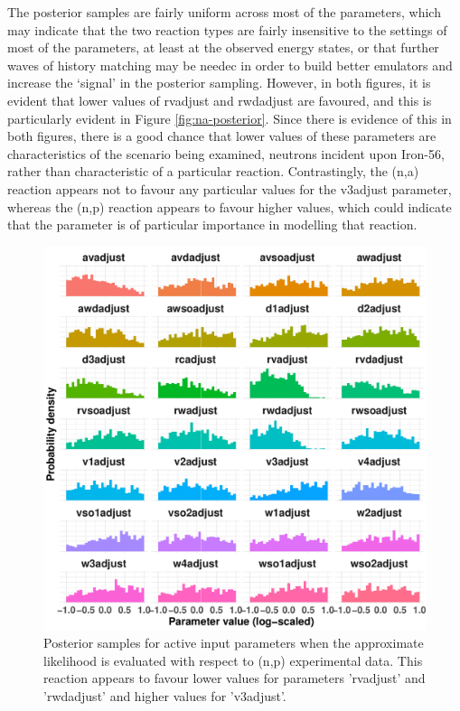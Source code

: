 \documentclass[
  12pt,
  a4paper,
  twoside]{book}
\begin{document}
The posterior samples are fairly uniform across most of the parameters, which may indicate that the two reaction types are fairly insensitive to the settings of most of the parameters, at least at the observed energy states, or that further waves of history matching may be needec in order to build better emulators and increase the `signal' in the posterior sampling. However, in both figures, it is evident that lower values of rvadjust and rwdadjust are favoured, and this is particularly evident in Figure \ref{fig:na-posterior}. Since there is evidence of this in both figures, there is a good chance that lower values of these parameters are characteristics of the scenario being examined, neutrons incident upon Iron-56, rather than characteristic of a particular reaction. Contrastingly, the (n,a) reaction appears not to favour any particular values for the v3adjust parameter, whereas the (n,p) reaction appears to favour higher values, which could indicate that the parameter is of particular importance in modelling that reaction.

\begin{figure}[H]

{\centering \includegraphics[width=0.8\linewidth]{figures/np_posterior} 

}

\caption{Posterior samples for active input parameters when the approximate likelihood is evaluated with respect to (n,p) experimental data. This reaction appears to favour lower values for parameters 'rvadjust' and 'rwdadjust' and higher values for 'v3adjust'.}\label{fig:np-posterior}
\end{figure}
\end{document}
